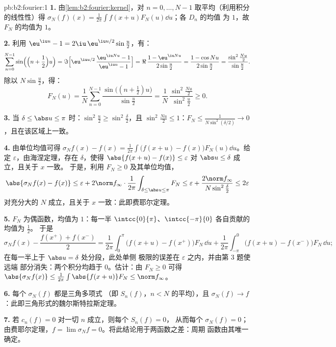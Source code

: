 \begin{solution}{pb:b2:fourier:1}
\textbf{1.} 由\cref{lem:b2:fourier:kernel}，对 $n = 0,
\dots, N-1$ 取平均（利用积分的线性性）得 $\sigma_N(f)(x) =
\frac{1}{2\pi}\int f(x+u)F_N(u)\dd u$；各 $D_n$ 的均值
为 $1$，故 $F_N$ 的均值为 $1$。

\textbf{2.} 利用 $\eu^{\iu u} - 1 = 2\iu\,\eu^{\iu
u/2}\sin\frac u2$，有：
\[
\sum_{n=0}^{N-1}\sin\Bigl(\Bigl(n + \frac12\Bigr)u\Bigr)
= \Im\Bigl[\eu^{\iu u/2}\,\frac{\eu^{\iu Nu} - 1}{\eu^{\iu u}
- 1}\Bigr]
= \Re\,\frac{1 - \eu^{\iu Nu}}{2\sin\frac u2}
= \frac{1 - \cos Nu}{2\sin\frac u2}
= \frac{\sin^2\frac{Nu}2}{\sin\frac u2} .
\]
除以 $N\sin\frac u2$，得：
\[
F_N(u) = \frac1N\sum_{n=0}^{N-1}
\frac{\sin\bigl((n+\frac12)u\bigr)}{\sin\frac u2}
= \frac{1}{N}\,
\frac{\sin^2\frac{Nu}{2}}{\sin^2\frac u2} \geq 0 .
\]

\textbf{3.} 当 $\delta \leq \abs u \leq \pi$ 时：$\sin^2\frac u2
\geq \sin^2\frac\delta2$，且 $\sin^2\frac{Nu}2 \leq 1$：$F_N
\leq \frac{1}{N\sin^2(\delta/2)} \to 0$，且在该区域上一致。

\textbf{4.} 由单位均值可得 $\sigma_Nf(x) - f(x) =
\frac{1}{2\pi}\int\bigl(f(x+u) - f(x)\bigr)F_N(u)\dd u$。给定
$\varepsilon$，由海涅定理，存在 $\delta$，使得 $\abs{f(x+u) - f(x)}
\leq \varepsilon$ 对 $\abs u \leq \delta$ 成立，且关于 $x$ 一致。
于是，利用 $F_N \geq 0$ 及其单位均值，
\[
\abs{\sigma_Nf(x) - f(x)}
\leq \varepsilon +
2\norm f_\infty\cdot\frac{1}{2\pi}
\int_{\delta\leq\abs u\leq\pi}F_N
\leq \varepsilon + \frac{2\norm
f_\infty}{N\sin^2\frac\delta2}
\leq 2\varepsilon
\]
对充分大的 $N$ 成立，且关于 $x$ 一致：此即费耶尔定理。

\textbf{5.} $F_N$ 为偶函数，均值为 $1$：每一半
$\intcc{0}{\pi}$、$\intcc{-\pi}{0}$ 各自贡献的均值为 $\frac12$。
于是
\[
\sigma_Nf(x) - \frac{f(x^+)+f(x^-)}{2}
= \frac{1}{2\pi}\int_0^\pi\bigl(f(x+u) -
f(x^+)\bigr)F_N\,\dd u
+ \frac{1}{2\pi}\int_{-\pi}^0\bigl(f(x+u) -
f(x^-)\bigr)F_N\,\dd u ;
\]
在每一半上于 $\abs u = \delta$ 处分段，此处单侧
极限的误差在 $\varepsilon$ 之内，并由第 3 题使远端
部分消失：两个积分均趋于 $0$。估计：由 $F_N \geq 0$
可得 $\abs{\sigma_Nf(x)} \leq
\frac{1}{2\pi}\int\abs{f(x+u)}F_N \leq \norm f_\infty$。

\textbf{6.} 每个 $\sigma_N(f)$ 都是三角多项式
（即 $S_n(f)$，$n < N$ 的平均），且 $\sigma_N(f) \to f$
：此即三角形式的魏尔斯特拉斯定理。

\textbf{7.} 若 $c_n(f) = 0$ 对一切 $n$ 成立，则每个 $S_n(f) = 0$，
从而每个 $\sigma_N(f) = 0$；由费耶尔定理，$f = \lim\sigma_Nf =
0$。将此结论用于两函数之差：周期
函数由其唯一确定。


\end{solution}
